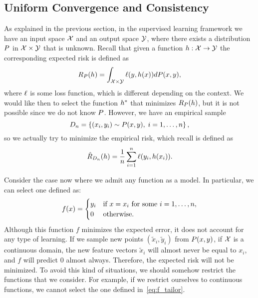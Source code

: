 \subsection{Uniform Convergence and Consistency}
%
As explained in the previous section, in the supervised learning framework we have an input space $\mathcal{X}$ and an output space $\mathcal{Y}$, where there exists a distribution $P$ in $\mathcal{X} \times \mathcal{Y}$ that is unknown. Recall that given a function $h: \mathcal{X} \to \mathcal{Y}$ the corresponding expected risk is defined as
\begin{equation}
    \nonumber %
    \exprisk(\hypf) = \int_{\Xspace \times \Yspace} \ell(y, \hypf(x)) d\distf(x, y) ,
\end{equation}
where $\ell$ is some loss function, which is different depending on the context.
%
We would like then to select the function ${h}^*$ that minimizes $R_P(h)$, but it is not possible since we do not know $P$. However, we have an empirical sample 
$$ D_{n} = \left\{(x_i, y_i) \sim P(x, y), \; i=1, \ldots, n\right\} ,$$
so we actually try to minimize the empirical risk, which recall is defined as
\begin{equation}
    \nonumber %
    \empriskn(\hypf) = \frac{1}{\nsamples} \sum_{i=1}^\nsamples \ell(y_i, \hypf(x_i)) .
\end{equation}

Consider the case now where we admit any function as a model. In particular, we can select one defined as: 
\begin{equation}
    \label{eq:f_tailor}
    f(x) = 
    \begin{cases}
        y_i & \text{if } x = x_i \text{ for some } i = 1, \ldots, \nsamples, \\
        0 & \text{otherwise}.
    \end{cases}
\end{equation}
Although this function $f$ minimizes the expected error, it does not account for any type of learning. If we sample new points $(\tilde{x}_i, \tilde{y}_i)$ from $P(x, y)$, if $\mathcal{X}$ is a continuous domain, the new feature vectors $\tilde{x}_i$ will almost never be equal to $x_i$, and $f$ will predict $0$ almost always. Therefore, the expected risk will not be minimized.
%
To avoid this kind of situations, we should somehow restrict the functions that we consider. For example, if we restrict ourselves to continuous functions, we cannot select the one defined in~\eqref{eq:f_tailor}.   


